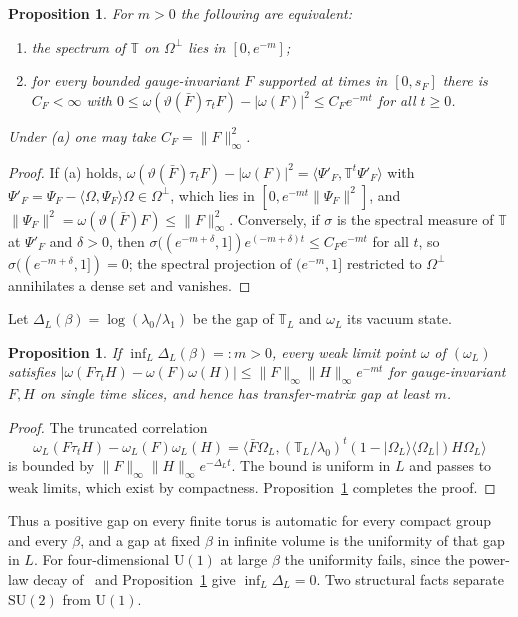 \documentclass[11pt]{amsart}
\newtheorem{proposition}[theorem]{Proposition}
\theoremstyle{definition}
\theoremstyle{remark}
\newcommand{\SU}{\mathrm{SU}}
\newcommand{\U}{\mathrm{U}}
\newcommand{\ip}[2]{\langle #1,#2\rangle}
\begin{document}
\begin{proposition}\label{prop:gapdecay}
For $m>0$ the following are equivalent:
\begin{enumerate}[label=\textup{(\alph*)}]
\item the spectrum of $\mathbb T$ on $\Omega^\perp$ lies in $[0,e^{-m}]$;
\item for every bounded gauge-invariant $F$ supported at times in $[0,s_F]$
there is $C_F<\infty$ with $0\le\omega(\vartheta(\bar F)\tau_tF)-|\omega(F)|^2
\le C_Fe^{-mt}$ for all $t\ge0$.
\end{enumerate}
Under \textup{(a)} one may take $C_F=\|F\|_\infty^2$.
\end{proposition}

\begin{proof}
If (a) holds, $\omega(\vartheta(\bar F)\tau_tF)-|\omega(F)|^2=\ip{\Psi'_F}{
\mathbb T^t\Psi'_F}$ with $\Psi'_F=\Psi_F-\ip\Omega{\Psi_F}\Omega\in\Omega^\perp$,
which lies in $[0,e^{-mt}\|\Psi_F\|^2]$, and $\|\Psi_F\|^2=\omega(\vartheta(
\bar F)F)\le\|F\|_\infty^2$. Conversely, if $\sigma$ is the spectral measure of
$\mathbb T$ at $\Psi'_F$ and $\delta>0$, then $\sigma((e^{-m+\delta},1])
e^{(-m+\delta)t}\le C_Fe^{-mt}$ for all $t$, so $\sigma((e^{-m+\delta},1])=0$;
the spectral projection of $(e^{-m},1]$ restricted to $\Omega^\perp$ annihilates
a dense set and vanishes.
\end{proof}

Let $\Delta_L(\beta)=\log(\lambda_0/\lambda_1)$ be the gap of $\mathbb T_L$ and
$\omega_L$ its vacuum state.

\begin{proposition}\label{prop:uniform}
If $\inf_L\Delta_L(\beta)=:m>0$, every weak limit point $\omega$ of $(\omega_L)$
satisfies $|\omega(F\tau_tH)-\omega(F)\omega(H)|\le\|F\|_\infty\|H\|_\infty
e^{-mt}$ for gauge-invariant $F,H$ on single time slices, and hence has
transfer-matrix gap at least $m$.
\end{proposition}

\begin{proof}
The truncated correlation
\[
\omega_L(F\tau_tH)-\omega_L(F)\omega_L(H)=\ip{\bar F\Omega_L}{(\mathbb T_L/
\lambda_0)^t(1-|\Omega_L\rangle\langle\Omega_L|)H\Omega_L}
\]
is bounded by
$\|F\|_\infty\|H\|_\infty e^{-\Delta_Lt}$. The bound is uniform in $L$ and passes
to weak limits, which exist by compactness. Proposition~\ref{prop:gapdecay}
completes the proof.
\end{proof}

Thus a positive gap on every finite torus is automatic for every compact group
and every $\beta$, and a gap at fixed $\beta$ in infinite volume is the
uniformity of that gap in $L$. For four-dimensional $\U(1)$ at large $\beta$ the
uniformity fails, since the power-law decay of~\cite{FS82} and
Proposition~\ref{prop:gapdecay} give $\inf_L\Delta_L=0$. Two structural facts
separate $\SU(2)$ from $\U(1)$.
\end{document}
